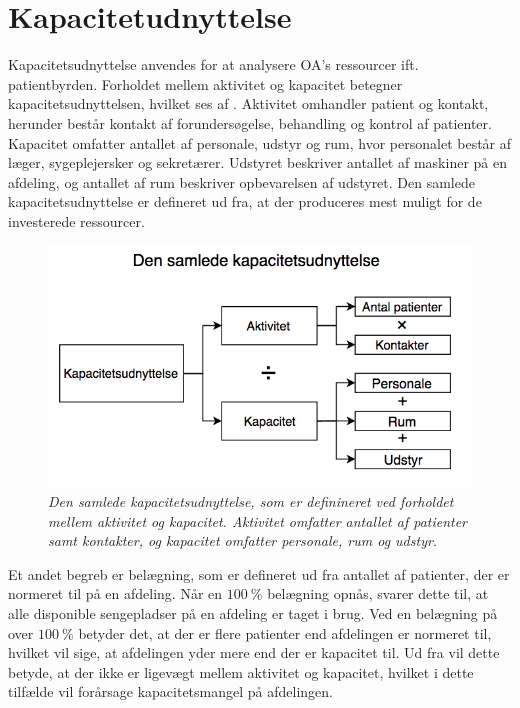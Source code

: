 \section{Kapacitetudnyttelse}
Kapacitetsudnyttelse anvendes for at analysere OA's ressourcer ift. patientbyrden. Forholdet mellem aktivitet og kapacitet betegner kapacitetsudnyttelsen, hvilket ses af . Aktivitet omhandler patient og kontakt, herunder består kontakt af forundersøgelse, behandling og kontrol af patienter. Kapacitet omfatter antallet af personale, udstyr og rum, hvor personalet består af læger, sygeplejersker og sekretærer. Udstyret beskriver antallet af maskiner på en afdeling, og antallet af rum beskriver opbevarelsen af udstyret. Den samlede kapacitetsudnyttelse er defineret ud fra, at der produceres mest muligt for de investerede ressourcer.\cite{Company2013} 

\begin{figure}[H]
	\flushleft 
	\centering
	\includegraphics[scale=.5]{figures/Kapacitetsudnyttelse.png}
	\flushleft
	\caption{\textit{Den samlede kapacitetsudnyttelse, som er definineret ved forholdet mellem aktivitet og kapacitet. Aktivitet omfatter antallet af patienter samt kontakter, og kapacitet omfatter personale, rum og udstyr.}\cite{Company2013}}
	\label{kapacitet}
\end{figure}

\noindent
Et andet begreb er belægning, som er defineret ud fra antallet af patienter, der er normeret til på en afdeling\cite{Heidmann2014}. Når en $100~\%$ belægning opnås, svarer dette til, at alle disponible sengepladser på en afdeling er taget i brug. Ved en belægning på over $100~\%$ betyder det, at der er flere patienter end afdelingen er normeret til, hvilket vil sige, at afdelingen yder mere end der er kapacitet til. Ud fra  vil dette betyde, at der ikke er ligevægt mellem aktivitet og kapacitet, hvilket i dette tilfælde vil forårsage kapacitetsmangel på afdelingen. 


